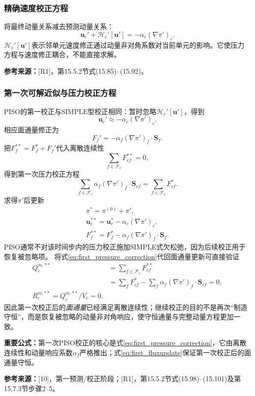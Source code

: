 \documentclass[UTF8,12pt,a4paper]{ctexart}
\numberwithin{equation}{section}
\newcommand{\Issa}{\textnormal{[10]}}
\newcommand{\Rone}{\textnormal{[R1]}}
\newcommand{\source}[1]{\par\smallskip\noindent\colorbox{sourcebg}{%
  \parbox{0.955\linewidth}{\footnotesize\color{sourcegray}\textbf{参考来源：}#1}}\par\smallskip}
\newcommand{\keytitle}[1]{\par\smallskip\noindent\colorbox{keybg}{%
  \parbox{0.965\linewidth}{\color{keyblue}\textbf{重要公式：}#1}}\par\smallskip}
\begin{document}
\subsubsection{精确速度校正方程}
将最终动量关系减去预测动量关系：
\begin{equation}
  \boxed{\bm u_c'+\mathcal H_c'[\bm u']
  =-\alpha_c(\nabla\pi')_c.}
  \label{eq:exact_velocity_correction}
\end{equation}
$\mathcal H_c'[\bm u']$表示邻单元速度修正通过动量非对角系数对当前单元的影响。它使压力方程与速度修正耦合，不能直接求解。
\source{\Rone，第15.5.2节式(15.85)--(15.92)。}

\subsubsection{第一次可解近似与压力校正方程}
PISO的第一校正与SIMPLE型校正相同：暂时忽略$\mathcal H_c'[\bm u']$，得到
\begin{equation}
  \boxed{\bm u_c'\approx-\alpha_c(\nabla\pi')_c.}
  \label{eq:first_uprime}
\end{equation}
相应面通量修正为
\begin{equation}
  \boxed{F_f'=-\alpha_f(\nabla\pi')_f\cdot\bm S_f.}
  \label{eq:first_fluxprime}
\end{equation}
把$F_f^{**}=F_f^*+F_f'$代入离散连续性
\[
  \sum_{f\in\mathcal F_c}F_{cf}^{**}=0,
\]
得到第一次压力校正方程
\begin{equation}
  \boxed{\sum_{f\in\mathcal F_c}
  \alpha_f(\nabla\pi')_f\cdot\bm S_{cf}
  =\sum_{f\in\mathcal F_c}F_{cf}^*.}
  \label{eq:first_pressure_correction}
\end{equation}
求得$\pi'$后更新
\begin{align}
  \boxed{\pi^*=\pi^{(0)}+\pi',}
  \label{eq:first_pupdate}\\
  \boxed{\bm u_c^{**}=\bm u_c^*
  -\alpha_c(\nabla\pi')_c,}
  \label{eq:first_uupdate}\\
  \boxed{F_f^{**}=F_f^*
  -\alpha_f(\nabla\pi')_f\cdot\bm S_f.}
  \label{eq:first_fluxupdate}
\end{align}
PISO通常不对该时间步内的压力校正施加SIMPLE式欠松弛，因为后续校正用于恢复被忽略项。
将式\eqref{eq:first_pressure_correction}代回面通量更新可直接验证
\begin{align}
  Q_c^{m,**}
  &=\sum_{f\in\mathcal F_c}F_{cf}^{**}\\
  &=\sum_fF_{cf}^*-
  \sum_f\alpha_f(\nabla\pi')_f\cdot\bm S_{cf}=0,\\
  \boxed{R_c^{m,**}=Q_c^{m,**}/V_c=0.}
  \label{eq:first_piso_continuity_proof}
\end{align}
因此第一次校正后的\emph{面通量}已经满足离散连续性；继续校正的目的不是再次“制造守恒”，而是恢复被忽略的动量非对角响应，使守恒通量与完整动量方程更加一致。
\keytitle{第一次PISO校正的核心是式\eqref{eq:first_pressure_correction}，它由离散连续性和动量响应系数$\alpha_f$严格推出；式\eqref{eq:first_fluxupdate}保证第一次校正后的面通量守恒。}
\source{\Issa，第一预测/校正阶段；\Rone，第15.5.2节式(15.98)--(15.101)及第15.7.3节步骤2--5。}
\end{document}
